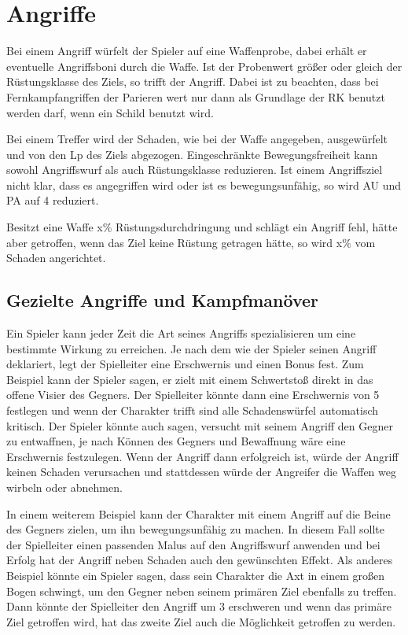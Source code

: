 \documentclass[../../Heldenanleitung2]{subfiles}
\begin{document}
\section{Angriffe}
Bei einem Angriff würfelt der Spieler auf eine Waffenprobe, dabei erhält er eventuelle Angriffsboni durch die Waffe. Ist der Probenwert größer oder gleich der Rüstungsklasse des Ziels, so trifft der Angriff. Dabei ist zu beachten, dass bei Fernkampfangriffen der Parieren wert nur dann als Grundlage der RK benutzt werden darf, wenn ein Schild benutzt wird.

Bei einem Treffer wird der Schaden, wie bei der Waffe angegeben, ausgewürfelt und von den Lp des Ziels abgezogen. Eingeschränkte Bewegungsfreiheit kann sowohl Angriffswurf als auch Rüstungsklasse reduzieren. Ist einem Angriffsziel nicht klar, dass es angegriffen wird oder ist es bewegungsunfähig, so wird AU und PA auf 4 reduziert.

Besitzt eine Waffe x\% Rüstungsdurchdringung und schlägt ein Angriff fehl, hätte aber getroffen, wenn das Ziel keine Rüstung getragen hätte, so wird x\% vom Schaden angerichtet.

\subsection{Gezielte Angriffe und Kampfmanöver}
Ein Spieler kann jeder Zeit die Art seines Angriffs spezialisieren um eine bestimmte Wirkung zu erreichen. Je nach dem wie der Spieler seinen Angriff deklariert, legt der Spielleiter eine Erschwernis und einen Bonus fest. Zum Beispiel kann der Spieler sagen, er zielt mit einem Schwertstoß direkt in das offene Visier des Gegners. Der Spielleiter könnte dann eine Erschwernis von 5 festlegen und wenn der Charakter trifft sind alle Schadenswürfel automatisch kritisch. Der Spieler könnte auch sagen, versucht mit seinem Angriff den Gegner zu entwaffnen, je nach Können des Gegners und Bewaffnung wäre eine Erschwernis festzulegen. Wenn der Angriff dann erfolgreich ist, würde der Angriff keinen Schaden verursachen und stattdessen würde der Angreifer die Waffen weg wirbeln oder abnehmen.

In einem weiterem Beispiel kann der Charakter mit einem Angriff auf die Beine des Gegners zielen, um ihn bewegungsunfähig zu machen. In diesem Fall sollte der Spielleiter einen passenden Malus auf den Angriffswurf anwenden und bei Erfolg hat der Angriff neben Schaden auch den gewünschten Effekt. Als anderes Beispiel könnte ein Spieler sagen, dass sein Charakter die Axt in einem großen Bogen schwingt, um den Gegner neben seinem primären Ziel ebenfalls zu treffen. Dann könnte der Spielleiter den Angriff um 3 erschweren und wenn das primäre Ziel getroffen wird, hat das zweite Ziel auch die Möglichkeit getroffen zu werden.
\end{document}
